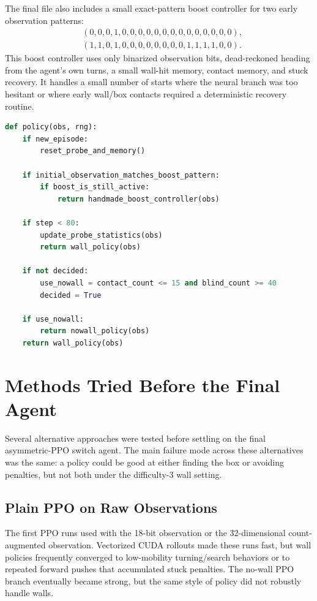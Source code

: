 \documentclass[11pt]{article}
\begin{document}
The final file also includes a small exact-pattern boost controller for two early
observation patterns:
\[
\begin{aligned}
  &(0,0,0,1,0,0,0,0,0,0,0,0,0,0,0,0,0,0),\\
  &(1,1,0,1,0,0,0,0,0,0,0,0,1,1,1,1,0,0).
\end{aligned}
\]
This boost controller uses only binarized observation bits, dead-reckoned heading from
the agent's own turns, a small wall-hit memory, contact memory, and stuck recovery.
It handles a small number of starts where the neural branch was too hesitant or where
early wall/box contacts required a deterministic recovery routine.

\begin{lstlisting}[language=Python,caption={High-level final policy logic.}]
def policy(obs, rng):
    if new_episode:
        reset_probe_and_memory()

    if initial_observation_matches_boost_pattern:
        if boost_is_still_active:
            return handmade_boost_controller(obs)

    if step < 80:
        update_probe_statistics(obs)
        return wall_policy(obs)

    if not decided:
        use_nowall = contact_count <= 15 and blind_count >= 40
        decided = True

    if use_nowall:
        return nowall_policy(obs)
    return wall_policy(obs)
\end{lstlisting}

\section{Methods Tried Before the Final Agent}

Several alternative approaches were tested before settling on the final asymmetric-PPO
switch agent.  The main failure mode across these alternatives was the same: a policy
could be good at either finding the box or avoiding penalties, but not both under the
difficulty-3 wall setting.

\subsection{Plain PPO on Raw Observations}

The first PPO runs used  with the 18-bit observation or the
32-dimensional count-augmented observation.  Vectorized CUDA rollouts made these runs
fast, but wall policies frequently converged to low-mobility turning/search behaviors
or to repeated forward pushes that accumulated stuck penalties.  The no-wall PPO
branch eventually became strong, but the same style of policy did not robustly handle
walls.
\end{document}
